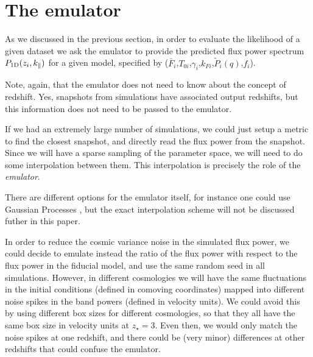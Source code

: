 \section{The emulator} \label{sec:emu}

As we discussed in the previous section, in order to evaluate the
likelihood of a given dataset we ask the emulator to provide the predicted
flux power spectrum $P_{\rm 1D}(z_i,k_\parallel)$ for a given model,
specified by ($\bar F_i$,$T_{0i}$,$\gamma_i$,$k_{Fi}$,$\tilde P_i(q)$,$f_i$).

Note, again, that the emulator does not need to know about the concept of
redshift.
Yes, snapshots from simulations have associated output redshifts, but this
information does not need to be passed to the emulator.


If we had an extremely large number of simulations, we could just setup a
metric to find the closest snapshot, and directly read the flux power
from the snapshot.
Since we will have a sparse sampling of the parameter space, we will need
to do some interpolation between them. 
This interpolation is precisely the role of the \textit{emulator}.

There are different options for the emulator itself, for instance one could
use Gaussian Processes \cite{Heitmann2009,Heitmann2014,SLAC2018,
Walther2018a,Bird2018,Rogers2018c}, but the exact interpolation scheme will
not be discussed futher in this paper.

In order to reduce the cosmic variance noise in the simulated flux power,
we could decide to emulate instead the ratio of the flux power with respect
to the flux power in the fiducial model, and use the same random seed in all
simulations.
However, in different cosmologies we will have the same fluctuations in the
initial conditions (defined in comoving coordinates) mapped into different 
noise spikes in the band powers (defined in velocity units).
We could avoid this by using different box sizes for different cosmologies,
so that they all have the same box size in velocity units at $z_\star=3$.
Even then, we would only match the noise spikes at one redshift, and there
could be (very minor) differences at other redshifts that could confuse
the emulator.

